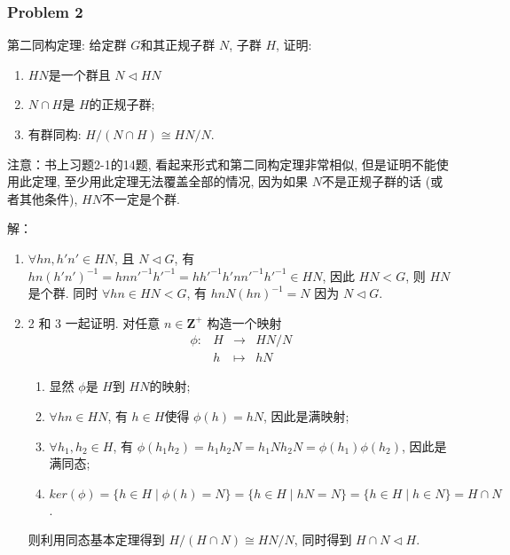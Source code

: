 \documentclass[a4paper,12pt]{ctexart}
\newcommand{\Z}{\mathbf{Z}}
\begin{document}
\subsubsection*{Problem 2}
    第二同构定理: 给定群 $ G $和其正规子群 $ N $, 子群 $ H $, 证明:
    \begin{enumerate}
      \item $ HN $是一个群且 $ N\triangleleft HN $
      \item $ N\cap H $是 $ H $的正规子群;
      \item 有群同构: $ H/(N\cap H)\cong HN/N  $. 
    \end{enumerate}

    注意：书上习题2-1的14题, 看起来形式和第二同构定理非常相似, 但是证明不能使用此定理, 至少用此定理无法覆盖全部的情况, 因为如果 $ N $不是正规子群的话 (或者其他条件), $ HN $不一定是个群.

    解：\begin{enumerate}
      \item $ \forall hn,h'n'\in HN $, 且 $ N\triangleleft G $,  有 $ hn(h'n')^{-1}=hnn'^{-1}h'^{-1}=hh'^{-1}h'nn'^{-1}h'^{-1}\in HN $, 因此 $ HN< G $, 则 $ HN $是个群. 同时 $ \forall hn\in HN<G $, 有 $ hnN(hn)^{-1}=N $ 因为 $ N\triangleleft G $.
      \item 2 和 3 一起证明.  对任意 $ n\in\Z^+ $ 构造一个映射
      \[ \begin{array}{cccc}
        \phi:& H&\rightarrow&HN/N\\
        &h&\mapsto&hN
      \end{array} \]
      \begin{enumerate}
        \item 显然 $ \phi $是 $ H $到 $ HN $的映射;
        \item $ \forall hn\in HN $, 有 $ h\in H $使得 $ \phi(h)=hN $, 因此是满映射;
        \item $ \forall h_1,h_2\in H $, 有 $ \phi(h_1h_2)=h_1h_2N=h_1Nh_2N=\phi(h_1)\phi(h_2) $, 因此是满同态;
        \item $ ker(\phi)=\{h\in H\mid \phi(h)=N\}=\{h\in H\mid hN=N\}=\{h\in H\mid h\in N\}=H\cap N $.
      \end{enumerate}
      则利用同态基本定理得到 $ H/(H\cap N)\cong HN/N $, 同时得到 $ H\cap N\triangleleft H $.
    \end{enumerate}
\end{document}
